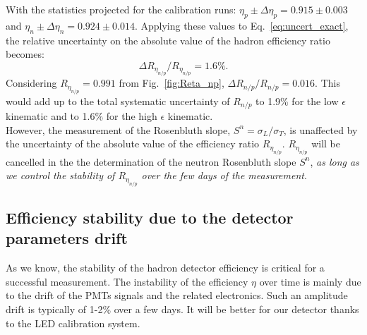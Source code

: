 \documentclass[11pt]{article}
\begin{document}
With the statistics projected for the calibration runs: $\eta_p \pm \Delta\eta_{p} = 0.915 \pm 0.003$ and $\eta_n \pm \Delta\eta_{n} = 0.924 \pm 0.014$.
Applying these values to Eq.~\ref{eq:uncert_exact}, %
the relative uncertainty on the absolute value of the hadron efficiency ratio becomes:
%
\begin{equation}
  \Delta R_{\eta_{n/p}}/R_{\eta_{n/p}} = 1.6\%.
\end{equation}
%
Considering $R_{\eta_{n/p}} = 0.991$ from Fig.~\ref{fig:Reta_np}, $\Delta R_{n/p}/R_{n/p} = 0.016$. 
This would add up to the total systematic uncertainty of $R_{n/p}$ to 1.9\% for the low $\epsilon$ kinematic and to 1.6\% for the high $\epsilon$ kinematic.\\

However, %
the measurement of the Rosenbluth slope, $S^n = \sigma_L/\sigma_T$, is unaffected by the uncertainty of the absolute value of the efficiency ratio $R_{\eta_{n/p}}$.
$R_{\eta_{n/p}}$ will be cancelled in the the determination of the neutron Rosenbluth slope $S^n$, 
{\it as long as we control the stability of $R_{\eta_{n/p}}$ over the few days of the measurement}.
%

\newpage

\subsection*{Efficiency stability due to the detector parameters drift}

As we know, the stability of the hadron detector efficiency is critical for a successful measurement.
The instability of the efficiency $\eta$ over time is mainly due to the drift of the PMTs signals and the related electronics.
Such an amplitude drift is typically of 1-2\% over a few days.
It will be better for our detector thanks to the LED calibration system.
\end{document}
